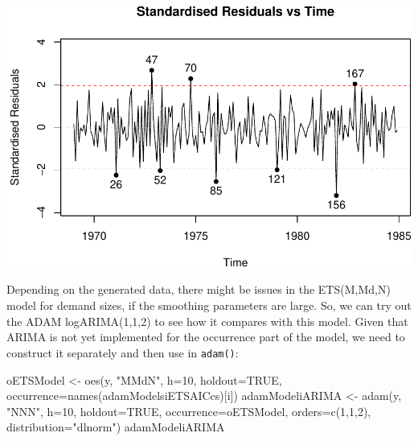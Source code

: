 \documentclass[
]{book}
\newenvironment{Shaded}{\begin{snugshade}}{\end{snugshade}}
\newcommand{\AttributeTok}[1]{\textcolor[rgb]{0.77,0.63,0.00}{#1}}
\newcommand{\ConstantTok}[1]{\textcolor[rgb]{0.00,0.00,0.00}{#1}}
\newcommand{\DecValTok}[1]{\textcolor[rgb]{0.00,0.00,0.81}{#1}}
\newcommand{\FunctionTok}[1]{\textcolor[rgb]{0.00,0.00,0.00}{#1}}
\newcommand{\NormalTok}[1]{#1}
\newcommand{\OtherTok}[1]{\textcolor[rgb]{0.56,0.35,0.01}{#1}}
\newcommand{\SpecialCharTok}[1]{\textcolor[rgb]{0.00,0.00,0.00}{#1}}
\newcommand{\StringTok}[1]{\textcolor[rgb]{0.31,0.60,0.02}{#1}}
\theoremstyle{definition}
\theoremstyle{definition}
\theoremstyle{definition}
\theoremstyle{definition}
\theoremstyle{remark}
\begin{document}
\begin{Shaded}
\end{Shaded}

\includegraphics{adam_files/figure-latex/unnamed-chunk-118-1.pdf}

Depending on the generated data, there might be issues in the ETS(M,Md,N) model for demand sizes, if the smoothing parameters are large. So, we can try out the ADAM logARIMA(1,1,2) to see how it compares with this model. Given that ARIMA is not yet implemented for the occurrence part of the model, we need to construct it separately and then use in \texttt{adam()}:

\begin{Shaded}
\begin{Highlighting}[]
\NormalTok{oETSModel }\OtherTok{\textless{}{-}} \FunctionTok{oes}\NormalTok{(y, }\StringTok{"MMdN"}\NormalTok{, }\AttributeTok{h=}\DecValTok{10}\NormalTok{, }\AttributeTok{holdout=}\ConstantTok{TRUE}\NormalTok{,}
                 \AttributeTok{occurrence=}\FunctionTok{names}\NormalTok{(adamModelsiETSAICcs)[i])}
\NormalTok{adamModeliARIMA }\OtherTok{\textless{}{-}} \FunctionTok{adam}\NormalTok{(y, }\StringTok{"NNN"}\NormalTok{, }\AttributeTok{h=}\DecValTok{10}\NormalTok{, }\AttributeTok{holdout=}\ConstantTok{TRUE}\NormalTok{,}
                        \AttributeTok{occurrence=}\NormalTok{oETSModel,}
                        \AttributeTok{orders=}\FunctionTok{c}\NormalTok{(}\DecValTok{1}\NormalTok{,}\DecValTok{1}\NormalTok{,}\DecValTok{2}\NormalTok{),}
                        \AttributeTok{distribution=}\StringTok{"dlnorm"}\NormalTok{)}
\NormalTok{adamModeliARIMA}
\end{Highlighting}
\end{Shaded}
\end{document}
